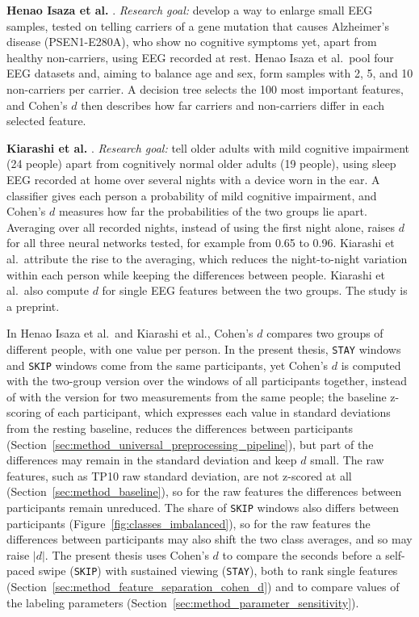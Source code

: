 \documentclass[12pt,a4paper]{report}
\begin{document}
\textbf{Henao Isaza et al.} \cite{henao_isaza_comprehensive_2026}. \emph{Research goal:} develop a way to enlarge small EEG samples, tested on telling carriers of a gene mutation that causes Alzheimer's disease (PSEN1-E280A), who show no cognitive symptoms yet, apart from healthy non-carriers, using EEG recorded at rest. Henao Isaza et al.\ pool four EEG datasets and, aiming to balance age and sex, form samples with 2, 5, and 10 non-carriers per carrier. A decision tree selects the 100 most important features, and Cohen's \(d\) then describes how far carriers and non-carriers differ in each selected feature.

\textbf{Kiarashi et al.} \cite{kiarashi_sleep-derived_2025}. \emph{Research goal:} tell older adults with mild cognitive impairment (24 people) apart from cognitively normal older adults (19 people), using sleep EEG recorded at home over several nights with a device worn in the ear. A classifier gives each person a probability of mild cognitive impairment, and Cohen's \(d\) measures how far the probabilities of the two groups lie apart. Averaging over all recorded nights, instead of using the first night alone, raises \(d\) for all three neural networks tested, for example from 0.65 to 0.96. Kiarashi et al.\ attribute the rise to the averaging, which reduces the night-to-night variation within each person while keeping the differences between people. Kiarashi et al.\ also compute \(d\) for single EEG features between the two groups. The study is a preprint.

In Henao Isaza et al.\ and Kiarashi et al., Cohen's \(d\) compares two groups of different people, with one value per person. In the present thesis, \texttt{STAY} windows and \texttt{SKIP} windows come from the same participants, yet Cohen's \(d\) is computed with the two-group version over the windows of all participants together, instead of with the version for two measurements from the same people; the baseline z-scoring of each participant, which expresses each value in standard deviations from the resting baseline, reduces the differences between participants (Section~\ref{sec:method_universal_preprocessing_pipeline}), but part of the differences may remain in the standard deviation and keep \(d\) small. The raw features, such as TP10 raw standard deviation, are not z-scored at all (Section~\ref{sec:method_baseline}), so for the raw features the differences between participants remain unreduced. The share of \texttt{SKIP} windows also differs between participants (Figure~\ref{fig:classes_imbalanced}), so for the raw features the differences between participants may also shift the two class averages, and so may raise \(|d|\). The present thesis uses Cohen's \(d\) to compare the seconds before a self-paced swipe (\texttt{SKIP}) with sustained viewing (\texttt{STAY}), both to rank single features (Section~\ref{sec:method_feature_separation_cohen_d}) and to compare values of the labeling parameters (Section~\ref{sec:method_parameter_sensitivity}).
\end{document}
